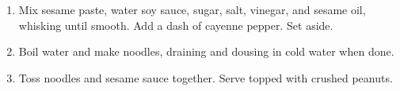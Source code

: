 
\begin{ingredients}
\end{ingredients}


\begin{recipe}
  \begin{enumerate}

  \item Mix sesame paste, water soy sauce, sugar, salt, vinegar, and
    sesame oil, whisking until smooth.  Add a dash of cayenne pepper.
    Set aside.
    
  \item Boil water and make noodles, draining and dousing in cold water when done.

  \item Toss noodles and sesame sauce together.  Serve topped with crushed peanuts.

  \end{enumerate}
\end{recipe}

